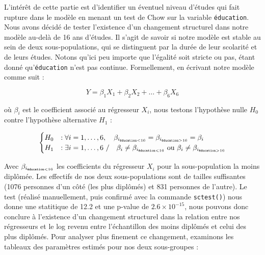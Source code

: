 \documentclass[a4paper, french, 11 pt]{article}\usepackage[]{graphicx}\usepackage[]{xcolor}
\begin{document}
L’intérêt de cette partie est d’identifier un éventuel niveau d’études qui fait rupture dans le modèle en menant un test de Chow sur la variable \texttt{éducation}. Nous avons décidé de tester l’existence d’un changement structurel dans notre modèle au-delà de 16 ans d’études. Il s’agit de savoir si notre modèle est stable au sein de deux sous-populations, qui se distinguent par la durée de leur scolarité et de leurs études. Notons qu’ici peu importe que l’égalité soit stricte ou pas, étant donné qu’\texttt{éducation} n’est pas continue. Formellement, en écrivant notre modèle comme suit :

\[Y = \beta_1X_1 + \beta_2X_2 + \dots + \beta_6X_6\] 

\noindent où $\beta_i$ est le coefficient associé au régresseur $X_i$, nous testons l'hypothèse nulle $H_0$ contre l'hypothèse alternative $H_1$ :


\[\begin{cases} H_0 &: \forall i=1, \dots, 6, \quad\beta_{i_{\texttt{\tiny éducation}<16}}=\beta_{i_{\texttt{\tiny éducation}>16} }= \beta_i \\ H_1 &: \exists i=1,\dots,6\ / \quad \beta_i\neq \beta_{i_{\texttt{\tiny éducation}<16}} \text{ ou } \beta_i\neq\beta_{i_{\texttt{\tiny éducation}>16} } \end{cases}\]



Avec $\beta_{i_{\texttt{\tiny éducation}<16} }$ les coefficients du régresseur $X_i$ pour la sous-population la moins diplômée. Les effectifs de nos deux sous-populations sont de tailles suffisantes (1076 personnes d'un côté (les plus diplômés) et 831 personnes de l'autre). Le test (réalisé manuellement, puis confirmé avec la commande \texttt{sctest()}) nous donne une statitique de 12.2 et une p-value de \ensuremath{2.6\times 10^{-15}}, nous pouvons donc conclure à l'existence d'un changement structurel dans la relation entre nos régresseurs et le log revenu entre l'échantillon des moins diplômés et celui des plus diplômés. Pour analyser plus finement ce changement, examinons les tableaux des paramètres estimés pour nos deux sous-groupes : 
\end{document}

